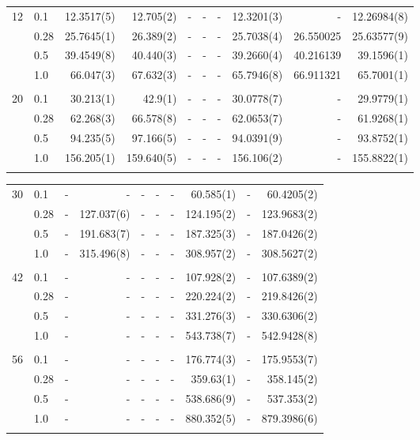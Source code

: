\begin{landscape}
\begin{table} [H]
\begin{tabularx}{\hsize}{l:l|RRRRRRRR}
		12 & 0.1 & 12.3517(5) & 12.705(2) & - & - & - & 12.3201(3) & - & 12.26984(8) \\ 
		& 0.28 & 25.7645(1) & 26.389(2) & - & - & - & 25.7038(4) & 26.550025 & 25.63577(9) \\
		& 0.5 & 39.4549(8) & 40.440(3) & - & - & - & 39.2660(4) & 40.216139 & 39.1596(1) \\
		& 1.0 & 66.047(3) & 67.632(3) & - & - & - & 65.7946(8) & 66.911321 & 65.7001(1) \\ \hdashline \\
		
		20 & 0.1 & 30.213(1) & 42.9(1) & - & - & - & 30.0778(7) & - & 29.9779(1) \\ 
		& 0.28 & 62.268(3) & 66.578(8) & - & - & - & 62.0653(7) & - & 61.9268(1) \\
		& 0.5 & 94.235(5) & 97.166(5) & - & - & - & 94.0391(9) & - & 93.8752(1) \\
		& 1.0 & 156.205(1) & 159.640(5) & - & - & - & 156.106(2) & - & 155.8822(1) \\ \hdashline
	\end{tabularx}
\end{table}

\begin{table} [H]
	\begin{tabularx}{\hsize}{l:l|RRRRRRRR} \\
		\label{tab:quantumdotswinteraction2D2}
		30 & 0.1 & - & - & - & - & - & 60.585(1) & - & 60.4205(2) \\ 
		& 0.28 & - & 127.037(6) & - & - & - & 124.195(2) & - & 123.9683(2) \\
		& 0.5 & - & 191.683(7) & - & - & - & 187.325(3) & - & 187.0426(2) \\
		& 1.0 & - & 315.496(8) & - & - & - & 308.957(2) & - & 308.5627(2) \\ \hdashline \\
		
		42 & 0.1 & - & - & - & - & - & 107.928(2) & - & 107.6389(2) \\ 
		& 0.28 & - & - & - & - & - & 220.224(2) & - & 219.8426(2) \\
		& 0.5 & - & - & - & - & - & 331.276(3) & - & 330.6306(2) \\
		& 1.0 & - & - & - & - & - & 543.738(7) & - & 542.9428(8) \\ \hdashline \\
		
		56 & 0.1 & - & - & - & - & - & 176.774(3) & - & 175.9553(7) \\ 
		& 0.28 & - & - & - & - & - & 359.63(1) & - & 358.145(2) \\
		& 0.5 & - & - & - & - & - & 538.686(9) & - & 537.353(2) \\
		& 1.0 & - & - & - & - & - & 880.352(5) & - & 879.3986(6) \\ \hdashline \\
		

\end{tabularx}
\end{table}
\end{landscape}
